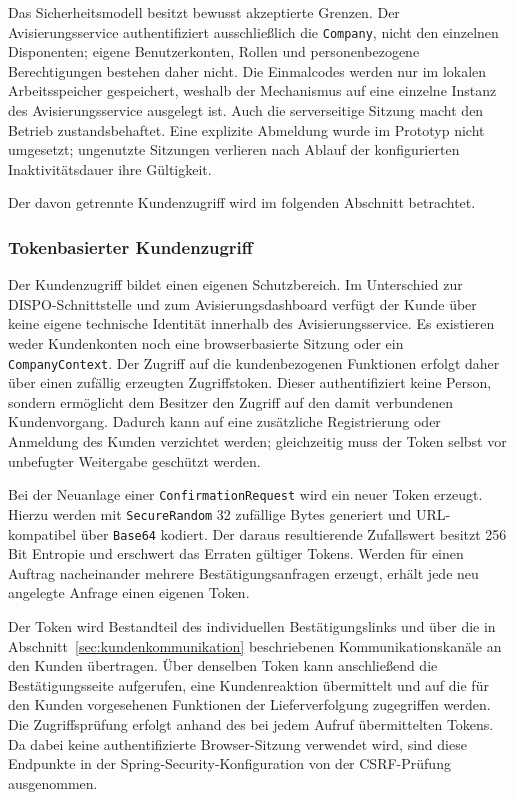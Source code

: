 \documentclass[
  12pt,
  a4paper,
  oneside
]{article}
\begin{document}
Das Sicherheitsmodell besitzt bewusst akzeptierte Grenzen. Der
Avisierungsservice authentifiziert ausschließlich die \texttt{Company}, nicht
den einzelnen Disponenten; eigene Benutzerkonten, Rollen und personenbezogene
Berechtigungen bestehen daher nicht. Die Einmalcodes werden nur im lokalen
Arbeitsspeicher gespeichert, weshalb der Mechanismus auf eine einzelne Instanz
des Avisierungsservice ausgelegt ist. Auch die serverseitige Sitzung macht den
Betrieb zustandsbehaftet. Eine explizite Abmeldung wurde im Prototyp nicht
umgesetzt; ungenutzte Sitzungen verlieren nach Ablauf der konfigurierten
Inaktivitätsdauer ihre Gültigkeit.

Der davon getrennte Kundenzugriff wird im folgenden Abschnitt betrachtet.

\subsubsection{Tokenbasierter Kundenzugriff}
\label{sec:kundenzugriff-token}

Der Kundenzugriff bildet einen eigenen Schutzbereich. Im Unterschied zur
DISPO-Schnittstelle und zum Avisierungsdashboard verfügt der Kunde über keine
eigene technische Identität innerhalb des Avisierungsservice. Es existieren
weder Kundenkonten noch eine browserbasierte
Sitzung oder ein \texttt{CompanyContext}. Der Zugriff auf die kundenbezogenen
Funktionen erfolgt daher über einen zufällig erzeugten Zugriffstoken. Dieser
authentifiziert keine Person, sondern ermöglicht dem Besitzer den Zugriff auf
den damit verbundenen Kundenvorgang. Dadurch kann auf eine zusätzliche
Registrierung oder Anmeldung des Kunden verzichtet werden; gleichzeitig muss
der Token selbst vor unbefugter Weitergabe geschützt werden.

Bei der Neuanlage einer \texttt{ConfirmationRequest} wird ein neuer Token
erzeugt. Hierzu werden mit \texttt{SecureRandom} 32 zufällige Bytes generiert
und URL-kompatibel über \texttt{Base64} kodiert. Der daraus resultierende
Zufallswert besitzt 256 Bit Entropie und erschwert das Erraten gültiger Tokens.
Werden für einen Auftrag nacheinander mehrere Bestätigungsanfragen erzeugt,
erhält jede neu angelegte Anfrage einen eigenen Token.

Der Token wird Bestandteil des individuellen Bestätigungslinks und über die in
Abschnitt~\ref{sec:kundenkommunikation} beschriebenen Kommunikationskanäle an
den Kunden übertragen. Über denselben Token kann anschließend die
Bestätigungsseite aufgerufen, eine Kundenreaktion übermittelt und auf die für den
Kunden vorgesehenen Funktionen der Lieferverfolgung zugegriffen werden. Die
Zugriffsprüfung erfolgt
anhand des bei jedem Aufruf übermittelten Tokens. Da dabei keine authentifizierte
Browser-Sitzung verwendet wird, sind diese Endpunkte in der
Spring-Security-Konfiguration von der CSRF-Prüfung ausgenommen.
\end{document}
